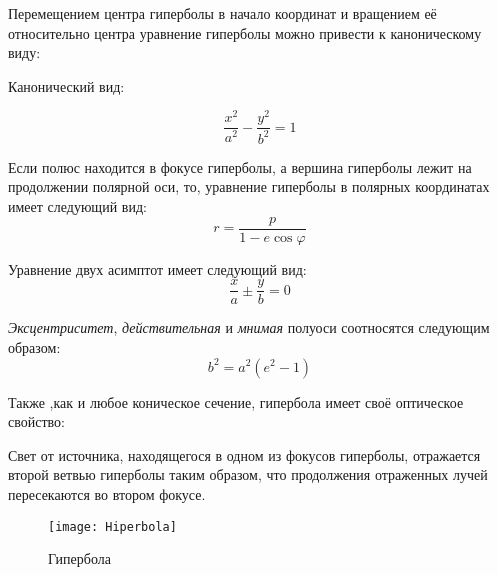 Перемещением центра гиперболы в начало координат и вращением её относительно центра уравнение гиперболы можно привести к каноническому виду:
\begin{flushleft}
Канонический вид:
\end{flushleft}

\begin{equation}
\frac{x^2}{a^2}-\frac{y^2}{b^2}=1
\end{equation}

Если полюс находится в фокусе гиперболы, а вершина гиперболы лежит на продолжении полярной оси, то, уравнение гиперболы в полярных координатах имеет следующий вид:
\begin{equation}
r=\frac{p}{1-e\cos\varphi}
\end{equation}

Уравнение двух асимптот имеет следующий вид:
\begin{equation}
\frac{x}{a}\pm\frac{y}{b}=0
\end{equation}

\textit{Эксцентриситет}, \textit{действительная} и \textit{мнимая} полуоси соотносятся следующим образом:
\begin{equation}
b^2=a^2(e^2-1)
\end{equation}

Также ,как и любое коническое сечение, гипербола имеет своё оптическое свойство:

Свет от источника, находящегося в одном из фокусов гиперболы, отражается второй ветвью гиперболы таким образом, что продолжения отраженных лучей пересекаются во втором фокусе.
\begin{figure}[h!]
\centering
\texttt{[image: Hiperbola]}
\caption{Гипербола \label{pic:the-pic}}
\end{figure}